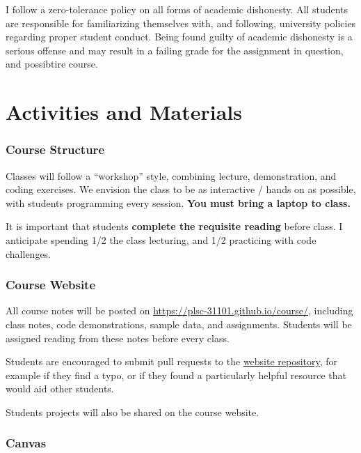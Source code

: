 \documentclass[]{book}
\begin{document}
I follow a zero-tolerance policy on all forms of academic dishonesty.
All students are responsible for familiarizing themselves with, and
following, university policies regarding proper student conduct. Being
found guilty of academic dishonesty is a serious offense and may result
in a failing grade for the assignment in question, and possibtire
course.

\section{Activities and Materials}\label{activities-and-materials}

\subsubsection*{Course Structure}\label{course-structure}

Classes will follow a ``workshop'' style, combining lecture,
demonstration, and coding exercises. We envision the class to be as
interactive / hands on as possible, with students programming every
session. \textbf{You must bring a laptop to class.}

It is important that students \textbf{complete the requisite reading}
before class. I anticipate spending 1/2 the class lecturing, and 1/2
practicing with code challenges.

\subsubsection*{Course Website}\label{course-website}

All course notes will be posted on
\url{https://plsc-31101.github.io/course/}, including class notes, code
demonstrations, sample data, and assignments. Students will be assigned
reading from these notes before every class.

Students are encouraged to submit pull requests to the
\href{https://github.com/plsc-31101/course/}{website repository}, for
example if they find a typo, or if they found a particularly helpful
resource that would aid other students.

Students projects will also be shared on the course website.

\subsubsection*{Canvas}\label{canvas}
\end{document}
